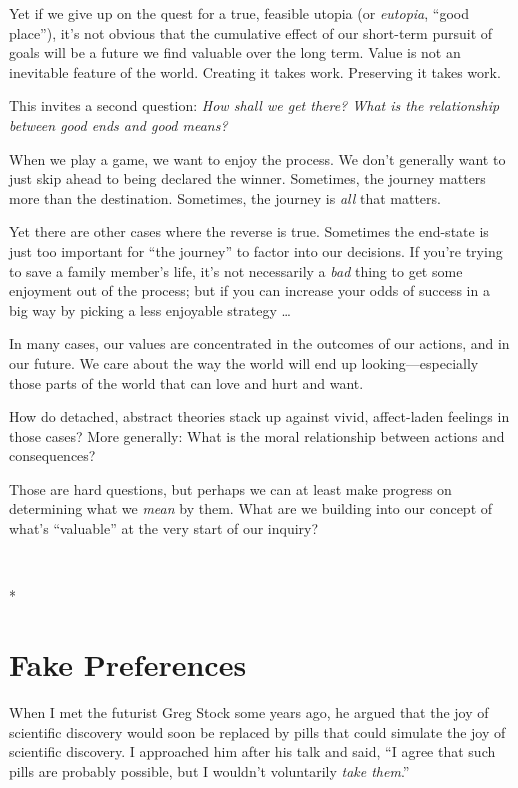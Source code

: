 {
 Yet if we give up on the quest for a true, feasible utopia (or
\textit{eutopia}, ``good place''),
it's not obvious that the cumulative effect of our
short-term pursuit of goals will be a future we find valuable over the
long term. Value is not an inevitable feature of the world. Creating it
takes work. Preserving it takes work.}

{
 This invites a second question: \textit{How shall we get there?
What is the relationship between good ends and good means?}}

{
 When we play a game, we want to enjoy the process. We
don't generally want to just skip ahead to being
declared the winner. Sometimes, the journey matters more than the
destination. Sometimes, the journey is \textit{all} that matters.}

{
 Yet there are other cases where the reverse is true. Sometimes the
end-state is just too important for ``the
journey'' to factor into our decisions. If
you're trying to save a family member's
life, it's not necessarily a \textit{bad} thing to get
some enjoyment out of the process; but if you can increase your odds of
success in a big way by picking a less enjoyable strategy \ldots}

{
 In many cases, our values are concentrated in the outcomes of our
actions, and in our future. We care about the way the world will end up
looking---especially those parts of the world that can love and hurt
and want.}

{
 How do detached, abstract theories stack up against vivid,
affect-laden feelings in those cases? More generally: What is the moral
relationship between actions and consequences?}

{
 Those are hard questions, but perhaps we can at least make
progress on determining what we \textit{mean} by them. What are we
building into our concept of what's
``valuable'' at the very start of
our inquiry?}

{
 ~}

{\centering
 *
\par}


\bigskip

\chapter{Fake Preferences}


{
 When I met the futurist Greg Stock some years ago, he argued that
the joy of scientific discovery would soon be replaced by pills that
could simulate the joy of scientific discovery. I approached him after
his talk and said, ``I agree that such pills are
probably possible, but I wouldn't voluntarily
\textit{take them}.'' }

